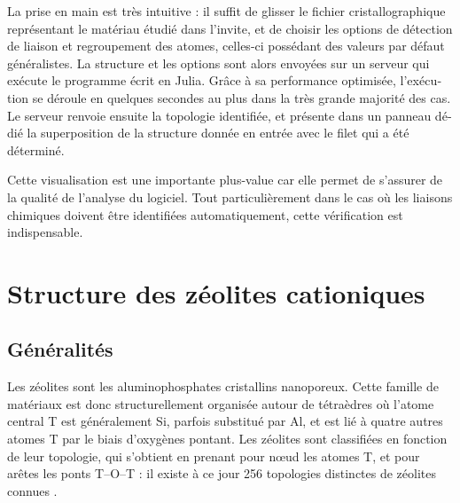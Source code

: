 \documentclass[thesis]{subfiles}
\begin{document}
\begin{otherlanguage}{french}
La prise en main est très intuitive : il suffit de glisser le fichier cristallographique représentant le matériau étudié dans l'invite, et de choisir les options de détection de liaison et regroupement des atomes, celles-ci possédant des valeurs par défaut généralistes. La structure et les options sont alors envoyées sur un serveur qui exécute le programme écrit en Julia. Grâce à sa performance optimisée, l'exécution se déroule en quelques secondes au plus dans la très grande majorité des cas. Le serveur renvoie ensuite la topologie identifiée, et présente dans un panneau dédié la superposition de la structure donnée en entrée avec le filet qui a été déterminé.

Cette visualisation est une importante plus-value car elle permet de s'assurer de la qualité de l'analyse du logiciel. Tout particulièrement dans le cas où les liaisons chimiques doivent être identifiées automatiquement, cette vérification est indispensable.


\section{Structure des zéolites cationiques}

\subsection{Généralités}

Les zéolites sont les aluminophosphates cristallins nanoporeux. Cette famille de matériaux est donc structurellement organisée autour de tétraèdres  où l'atome central T est généralement Si, parfois substitué par Al, et est lié à quatre autres atomes T par le biais d'oxygènes pontant. Les zéolites sont classifiées en fonction de leur topologie, qui s'obtient en prenant pour n\oe ud les atomes T, et pour arêtes les ponts T--O--T : il existe à ce jour 256 topologies distinctes de zéolites connues \autocite{IZA}.


\end{otherlanguage}
\end{document}
